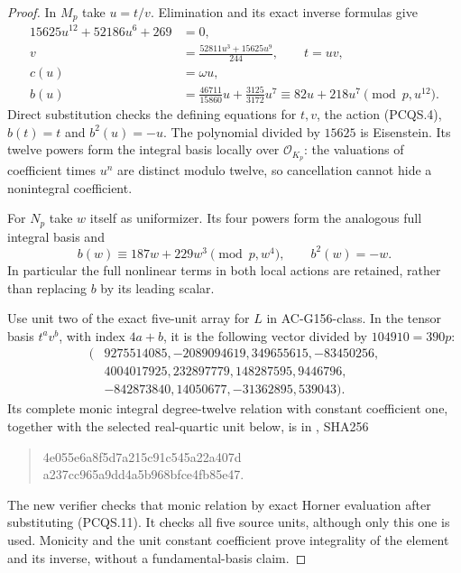 \begin{proof}
In $M_p$ take $u=t/v$.
Elimination and its exact inverse formulas give
\[
 \begin{aligned}
 15625u^{12}+52186u^6+269&=0,\\
 v&=\frac{52811u^3+15625u^9}{244},\qquad t=uv,\\
 c(u)&=\omega u,\\
 b(u)&=\frac{46711}{15860}u+\frac{3125}{3172}u^7
                      \equiv82u+218u^7\pmod{p,u^{12}}.
 \end{aligned}
 \tag{PCQS.11}
\]
Direct substitution checks the defining equations for $t,v$,
the action (PCQS.4), $b(t)=t$ and $b^2(u)=-u$.
The polynomial divided by $15625$ is Eisenstein.
Its twelve powers form the integral basis locally over
$\mathcal O_{K_p}$: the valuations of coefficient times $u^n$
are distinct modulo twelve, so cancellation cannot hide a
nonintegral coefficient.

For $N_p$ take $w$ itself as uniformizer.
Its four powers form the analogous full integral basis and
\[
          b(w)\equiv187w+229w^3\pmod{p,w^4},
          \qquad b^2(w)=-w.
 \tag{PCQS.12}
\]
In particular the full nonlinear terms in both local actions
are retained, rather than replacing $b$ by its leading scalar.

Use unit two of the exact five-unit array for $L$ in
AC-G156-class.  In the tensor basis $t^av^b$, with index $4a+b$,
it is the following vector divided by $104910=390p$:
\[
 \begin{aligned}
 (&9275514085,-2089094619,349655615,-83450256,\\
  &4004017925,232897779,148287595,9446796,\\
  &-842873840,14050677,-31362895,539043).
 \end{aligned}
 \tag{PCQS.13}
\]
Its complete monic integral degree-twelve relation with constant
coefficient one, together with the selected real-quartic unit
below, is in , SHA256
\begin{quote}\ttfamily\small
4e055e6a8f5d7a215c91c545a22a407d\\
a237cc965a9dd4a5b968bfce4fb85e47.
\end{quote}
The new verifier checks that monic relation by exact Horner
evaluation after substituting (PCQS.11).
It checks all five source units, although only this one is used.
Monicity and the unit constant coefficient prove integrality
of the element and its inverse, without a fundamental-basis claim.


\end{proof}
